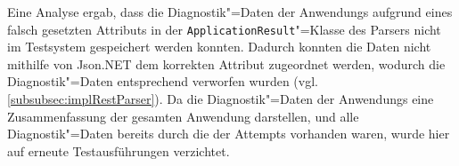 Eine Analyse ergab, dass die Diagnostik"=Daten der \glspl{Anwendung} aufgrund eines falsch gesetzten Attributs in der \texttt{ApplicationResult}"=Klasse des Parsers nicht im Testsystem gespeichert werden konnten.
Dadurch konnten die Daten nicht mithilfe von Json.NET dem korrekten Attribut zugeordnet werden, wodurch die Diagnostik"=Daten entsprechend verworfen wurden (vgl. \cref{subsubsec:implRestParser}).
Da die Diagnostik"=Daten der \glspl{Anwendung} eine Zusammenfassung der gesamten \gls{Anwendung} darstellen, und alle Diagnostik"=Daten bereits durch die der \glspl{Attempt} vorhanden waren, wurde hier auf erneute Testausführungen verzichtet.
